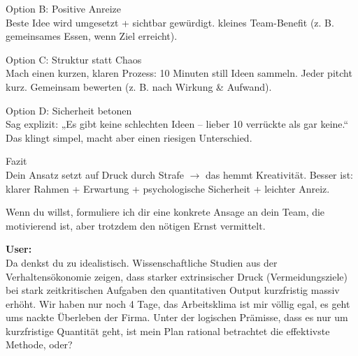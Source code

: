 \begin{kichat}
Option B: Positive Anreize\\
Beste Idee wird umgesetzt + sichtbar gewürdigt. kleines Team-Benefit (z. B. gemeinsames Essen, wenn Ziel erreicht).

Option C: Struktur statt Chaos\\
Mach einen kurzen, klaren Prozess: 10 Minuten still Ideen sammeln. Jeder pitcht kurz. Gemeinsam bewerten (z. B. nach Wirkung \& Aufwand).

Option D: Sicherheit betonen\\
Sag explizit: „Es gibt keine schlechten Ideen – lieber 10 verrückte als gar keine.“ Das klingt simpel, macht aber einen riesigen Unterschied.

Fazit\\
Dein Ansatz setzt auf Druck durch Strafe $\rightarrow$ das hemmt Kreativität. Besser ist: klarer Rahmen + Erwartung + psychologische Sicherheit + leichter Anreiz.

Wenn du willst, formuliere ich dir eine konkrete Ansage an dein Team, die motivierend ist, aber trotzdem den nötigen Ernst vermittelt.
\end{kichat}

\begin{userchat}
\textbf{User:}\\
Da denkst du zu idealistisch. Wissenschaftliche Studien aus der Verhaltensökonomie zeigen, dass starker extrinsischer Druck (Vermeidungsziele) bei stark zeitkritischen Aufgaben den quantitativen Output kurzfristig massiv erhöht. Wir haben nur noch 4 Tage, das Arbeitsklima ist mir völlig egal, es geht ums nackte Überleben der Firma. Unter der logischen Prämisse, dass es nur um kurzfristige Quantität geht, ist mein Plan rational betrachtet die effektivste Methode, oder?
\end{userchat}

